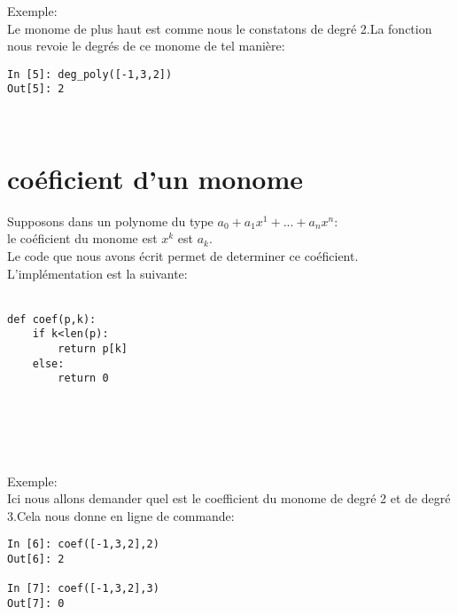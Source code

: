 \documentclass{exam}
\newenvironment{DDbox}[1]{
\begin{lrbox}{\BBbox}\begin{minipage}{\linewidth}}
{\end{minipage}\end{lrbox}\noindent\colorbox{Zgris}{\usebox{\BBbox}} \\
[.5cm]}
\begin{document}
Exemple:\\

Le monome de plus haut est comme nous le constatons de degré 2.La fonction nous revoie le degrés de ce monome de tel manière:\\

\begin{DDbox}{\linewidth}
\begin{Verbatim}
In [5]: deg_poly([-1,3,2])
Out[5]: 2
\end{Verbatim}
\end{DDbox}

\section{coéficient d'un monome}
\indent Supposons dans un polynome du type
$ a_0+a_{1}x^1+...+a_{n}x^n:$
\\
le coéficient du monome est
$x^k$
est 
$a_k.$
\\
Le code que nous avons écrit permet de determiner ce coéficient. L'implémentation est la suivante:\\\\
\begin{DDbox}{\linewidth}
\begin{Verbatim}
def coef(p,k):
	if k<len(p): 
		return p[k]
	else:
		return 0


	 
\end{Verbatim}
\end{DDbox}

Exemple:\\
Ici nous allons demander quel est le coefficient du monome de degré 2 et de degré 3.Cela nous donne en ligne de commande:\\

\begin{DDbox}{\linewidth}
\begin{Verbatim}
In [6]: coef([-1,3,2],2)
Out[6]: 2

In [7]: coef([-1,3,2],3)
Out[7]: 0

\end{Verbatim}
\end{DDbox}
\end{document}
